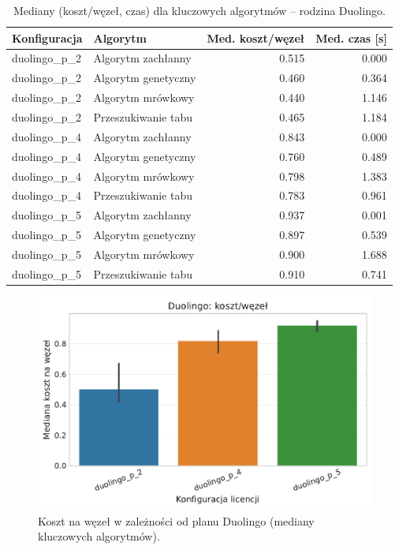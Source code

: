 \begin{table}[H]
  \centering
  \caption{Mediany (koszt/węzeł, czas) dla kluczowych algorytmów -- rodzina Duolingo.}
  \label{tab:ext-duolingo-static}
  \begin{tabular}{llrr}
    \toprule
    \textbf{Konfiguracja} & \textbf{Algorytm}   & \textbf{Med. koszt/węzeł} & \textbf{Med. czas [s]} \\
    \midrule
    duolingo\_p\_2        & Algorytm zachłanny  & 0.515                     & 0.000                  \\
    duolingo\_p\_2        & Algorytm genetyczny & 0.460                     & 0.364                  \\
    duolingo\_p\_2        & Algorytm mrówkowy   & 0.440                     & 1.146                  \\
    duolingo\_p\_2        & Przeszukiwanie tabu & 0.465                     & 1.184                  \\
    duolingo\_p\_4        & Algorytm zachłanny  & 0.843                     & 0.000                  \\
    duolingo\_p\_4        & Algorytm genetyczny & 0.760                     & 0.489                  \\
    duolingo\_p\_4        & Algorytm mrówkowy   & 0.798                     & 1.383                  \\
    duolingo\_p\_4        & Przeszukiwanie tabu & 0.783                     & 0.961                  \\
    duolingo\_p\_5        & Algorytm zachłanny  & 0.937                     & 0.001                  \\
    duolingo\_p\_5        & Algorytm genetyczny & 0.897                     & 0.539                  \\
    duolingo\_p\_5        & Algorytm mrówkowy   & 0.900                     & 1.688                  \\
    duolingo\_p\_5        & Przeszukiwanie tabu & 0.910                     & 0.741                  \\
  \end{tabular}
\end{table}

\begin{figure}[H]
  \centering
  \includegraphics[width=0.6\linewidth]{assets/figures/extensions/static/duolingo_cost_per_node_comparison.pdf}
  \caption{Koszt na węzeł w zależności od planu Duolingo (mediany kluczowych algorytmów).}
  \label{fig:ext-duolingo-cost}
\end{figure}

